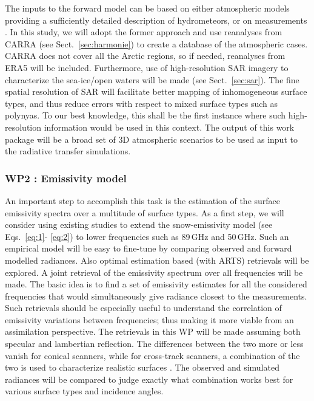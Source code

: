 \documentclass[12pt,oneside,a4paper]{article}
\begin{document}
\label{sec:atmscenes}
The inputs to the forward model can be based on either atmospheric models
providing a sufficiently detailed description of hydrometeors, or on
measurements \citep{ekelund:using:20}. In this study, we will adopt the former
approach and use reanalyses from CARRA (see Sect.~\ref{sec:harmonie}) to create a database of the atmospheric cases. CARRA does not cover all the Arctic regions, so if needed, reanalyses from ERA5 will be included. Furthermore, use of
high-resolution SAR imagery to characterize the sea-ice/open waters will be
made (see Sect.~\ref{sec:sar}). The fine spatial resolution of SAR will facilitate better mapping of
inhomogeneous surface types, and thus reduce errors with respect to mixed
surface types such as polynyas. To our best knowledge, this shall be the first
instance where such high-resolution information would be used in this context.
The output of this work package will be a broad set of 3D atmospheric scenarios
to be used as input to the radiative transfer simulations. \vspace{-1.0ex}

\subsubsection*{WP2 : Emissivity model}
%
\label{sec:emissivity}
An important step to accomplish this task is the estimation of the surface
emissivity spectra over a multitude of surface types. As a first step, we will
consider using existing studies to extend the snow-emissivity model (see
Eqs.~\ref{eq:1}- \ref{eq:2}) to lower frequencies such as 89\,GHz and 50\,GHz.
Such an empirical model will be easy to fine-tune by comparing observed and
forward modelled radiances. Also optimal estimation based (with ARTS) retrievals will be
explored. A joint retrieval of the emissivity spectrum over all frequencies
will be made. The basic idea is to find a set of emissivity estimates for all
the considered frequencies that would simultaneously give radiance closest to
the measurements. Such retrievals should be especially useful to understand
the correlation of emissivity variations between frequencies; thus making it
more viable from an assimilation perspective. The retrievals in this WP will be
made assuming both specular and lambertian reflection. The differences between
the two more or less vanish for conical scanners, while for cross-track
scanners, a combination of the two is used to characterize realistic surfaces
\citep{matzler:2005:onthe}. The observed and simulated radiances will be compared to judge exactly what combination works best for various surface types and incidence angles.
\end{document}
